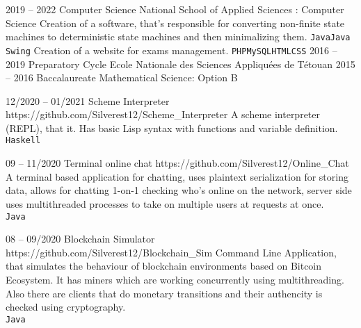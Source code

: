 \documentclass[10pt]{developercv} %
\begin{document}

\begin{entrylist}
	\entry
		{2019 -- 2022}
		{Computer Science}
		{National School of Applied Sciences : Computer Science}
	    {   {Creation of a software, that's responsible for converting non-finite state machines
                to deterministic state machines and then minimalizing them.
            \newline\texttt{Java}\slashsep\texttt{Java Swing}}
            {\newline Creation of a website for exams management.
            \newline\texttt{PHP}\slashsep\texttt{MySQL}\slashsep\texttt{HTML}\slashsep\texttt{CSS}}
        }
	\entry
		{2016 -- 2019}
		{Preparatory Cycle}
		{Ecole Nationale des Sciences Appliquées de Tétouan}
        {}
	\entry
		{2015 -- 2016}
		{Baccalaureate Mathematical Science: Option B}
		{}
		{}
\end{entrylist}




\begin{entrylist}
	\entry
		{12/2020 -- 01/2021}
		{Scheme Interpreter}
		{https://github.com/Silverest12/Scheme\_Interpreter}
        {A scheme interpreter (REPL), that it. Has basic Lisp syntax 
        with functions and variable definition.\\ \texttt{Haskell}}

    \entry
		{09 -- 11/2020}
		{Terminal online chat}
		{https://github.com/Silverest12/Online\_Chat}
        {A terminal based application for chatting, uses plaintext 
        serialization for storing data, allows for chatting 1-on-1
        checking who's online on the network, server side uses 
        multithreaded processes to take on multiple users at requests
        at once.\\ \texttt{Java}}

    \entry
		{08 -- 09/2020}
		{Blockchain Simulator}
		{https://github.com/Silverest12/Blockchain\_Sim}
        {Command Line Application, that simulates the behaviour of
        blockchain environments based on Bitcoin Ecosystem. It has
        miners which are working concurrently using multithreading. 
        Also there are clients that do monetary transitions and their
        authencity is checked using cryptography.\\ \texttt{Java}}
\end{entrylist}
\end{document}
